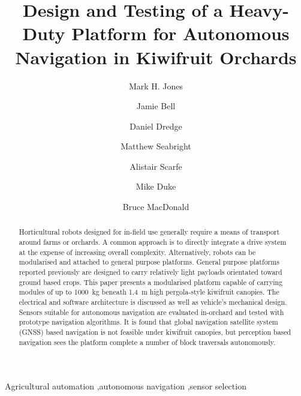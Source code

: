 \documentclass[preprint,authoryear,12pt]{elsarticle}
\begin{document}
\begin{frontmatter}

\title{Design and Testing of a Heavy-Duty Platform for Autonomous Navigation in Kiwifruit Orchards}

\author[UoW]{Mark H. Jones}

\author[UoA]{Jamie Bell}
\author[UoW]{Daniel Dredge}
\author[UoW]{Matthew Seabright}
\author[RPL]{Alistair Scarfe}
\author[UoW]{Mike Duke}
\author[UoA]{Bruce MacDonald}

\address[UoW]{School of Engineering, University of Waikato, Hamilton, New Zealand}
\address[UoA]{Faculty of Engineering, University of Auckland, Auckland, New Zealand}
\address[RPL]{Robotics Plus Ltd, Newnham Innovation Park, Tauranga, New Zealand}

\begin{abstract}
    Horticultural robots designed for in-field use generally require a means of transport around farms or orchards.
    A common approach is to directly integrate a drive system at the expense of increasing overall complexity.
    Alternatively, robots can be modularised and attached to general purpose platforms.
    General purpose platforms reported previously are designed to carry relatively light payloads orientated toward ground based crops.
    This paper presents a modularised platform capable of carrying modules of up to \SI{1000}{\kilo\gram} beneath \SI{1.4}{\meter} high pergola-style kiwifruit canopies.
    The electrical and software architecture is discussed as well as vehicle's mechanical design.
    Sensors suitable for autonomous navigation are evaluated in-orchard and tested with prototype navigation algorithms.
    It is found that global navigation satellite system (GNSS) based navigation is not feasible under kiwifruit canopies, but perception based navigation sees the platform complete a number of block traversals autonomously.


\end{abstract}

\begin{keyword}
    Agricultural automation \sep autonomous navigation \sep sensor selection
\end{keyword}

\end{frontmatter}

\linenumbers

\begin{table}
  \small
   \begin{framed}
     \printnomenclature
   \end{framed}
\end{table}
\end{document}
